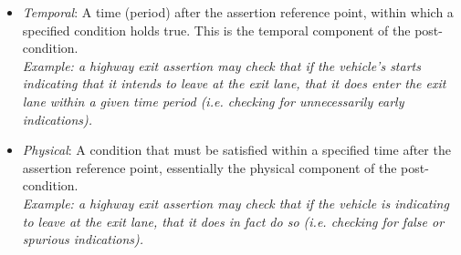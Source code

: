 \begin{itemize}
    \begin{itemize}
        \item \textit{Temporal}: A time (period) after the assertion reference point, within which a specified condition holds true. This is the temporal component of the post-condition.\\
        \textit{Example: a highway exit assertion may check that if the vehicle's starts indicating that it intends to leave at the exit lane, that it does enter the exit lane within a given time period (i.e. checking for unnecessarily early indications).}
        \item \textit{Physical}: A condition that must be satisfied within a specified time after the assertion reference point, essentially the physical component of the post-condition.\\
        \textit{Example: a highway exit  assertion may check that if the vehicle is indicating to leave at the exit lane, that it does in fact do so (i.e. checking for false or spurious indications).}
    \end{itemize}
\end{itemize}

